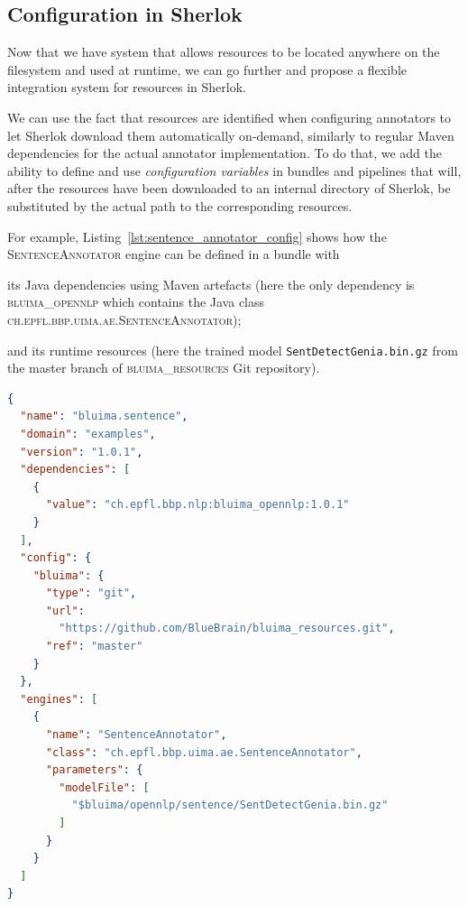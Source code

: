 \documentclass{article}
\newcommand{\ID}[1]{{\textsc{#1}}}
\newcommand{\PATH}[1]{\mbox{\texttt{#1}}}
\begin{document}
\subsection{Configuration in Sherlok}
\label{sec:config_in_sherlok}

Now that we have system that allows resources to be located anywhere on the filesystem and used at
runtime, we can go further and propose a flexible integration system for resources in Sherlok.

We can use the fact that resources are identified when configuring annotators to let Sherlok
download them automatically on-demand, similarly to regular Maven dependencies for the actual
annotator implementation. To do that, we add the ability to define and use \emph{configuration
variables} in bundles and pipelines that will, after the resources have been downloaded to an
internal directory of Sherlok, be substituted by the actual path to the corresponding resources.

For example, Listing~\ref{lst:sentence_annotator_config} shows how the \ID{SentenceAnnotator} engine
can be defined in a bundle with
\begin{enumerate*}[label=\itshape\alph*\upshape)]
    \item its Java dependencies using Maven artefacts (here the only dependency is
        \ID{bluima\_opennlp} which contains the Java class \ID{ch.epfl.bbp.uima.ae.SentenceAnnotator});
    \item and its runtime resources (here the trained model \PATH{SentDetectGenia.bin.gz} from the
        master branch of \ID{bluima\_resources} Git repository).
\end{enumerate*}

\begin{lstlisting}[float,language=json,
                   caption=Configuration of \ID{SentenceAnnotator} in a Sherlok bundle,
                   label=lst:sentence_annotator_config]
{
  "name": "bluima.sentence",
  "domain": "examples",
  "version": "1.0.1",
  "dependencies": [
    {
      "value": "ch.epfl.bbp.nlp:bluima_opennlp:1.0.1"
    }
  ],
  "config": {
    "bluima": {
      "type": "git",
      "url":
        "https://github.com/BlueBrain/bluima_resources.git",
      "ref": "master"
    }
  },
  "engines": [
    {
      "name": "SentenceAnnotator",
      "class": "ch.epfl.bbp.uima.ae.SentenceAnnotator",
      "parameters": {
        "modelFile": [
          "$bluima/opennlp/sentence/SentDetectGenia.bin.gz"
        ]
      }
    }
  ]
}
\end{lstlisting}
\end{document}
